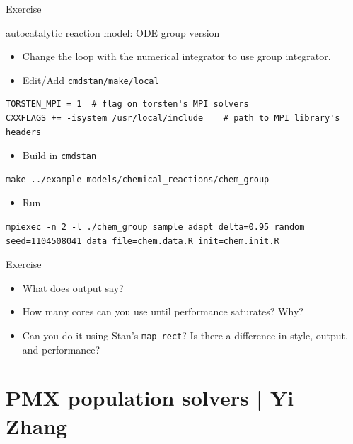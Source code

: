 \documentclass[presentation, allowframebreaks]{beamer}
\begin{document}
\begin{frame}[fragile,label={sec:orge3efb74}]{Exercise}
 \begin{block}{autocatalytic reaction model: ODE group version}
\begin{itemize}
\item Change the loop with the numerical integrator to use group
integrator.

\item Edit/Add \texttt{cmdstan/make/local}
\end{itemize}
\begin{verbatim}
TORSTEN_MPI = 1  # flag on torsten's MPI solvers
CXXFLAGS += -isystem /usr/local/include    # path to MPI library's headers
\end{verbatim}
\begin{itemize}
\item Build in \texttt{cmdstan}
\end{itemize}
\begin{verbatim}
make ../example-models/chemical_reactions/chem_group
\end{verbatim}
\begin{itemize}
\item Run
\end{itemize}
\begin{verbatim}
mpiexec -n 2 -l ./chem_group sample adapt delta=0.95 random seed=1104508041 data file=chem.data.R init=chem.init.R
\end{verbatim}
\end{block}
\end{frame}

\begin{frame}[fragile,label={sec:org4291de0}]{Exercise}
 \begin{itemize}
\item What does output say?
\item How many cores can you use until performance saturates? Why?
\item Can you do it using Stan's \texttt{map\_rect}? Is there a
difference in style, output, and performance?
\end{itemize}
\end{frame}

\section{PMX population solvers | \footnotesize{Yi Zhang}}
\label{sec:orged55547}
\end{document}
